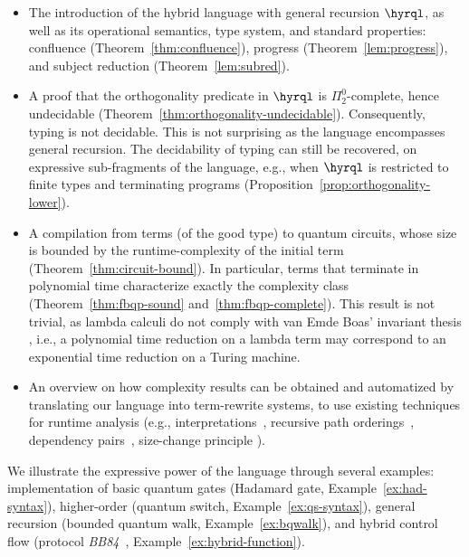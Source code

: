 \begin{itemize}
  \item The introduction of the hybrid language with general recursion $\hyrql$,
    as well as its operational semantics, type system, and
    standard properties: confluence (Theorem~\ref{thm:confluence}), progress
    (Theorem~\ref{lem:progress}), and subject reduction
    (Theorem~\ref{lem:subred}).
  \item A proof that the orthogonality predicate in $\hyrql$ is
    $\Pi^0_2$-complete, hence undecidable
    (Theorem~\ref{thm:orthogonality-undecidable}). Consequently, typing is not
    decidable. This is not surprising as the language encompasses general
    recursion. The decidability of typing can still be recovered, on expressive
    sub-fragments of the language, e.g., when $\hyrql$ is restricted to finite
    types and terminating programs (Proposition~\ref{prop:orthogonality-lower}).
  \item A compilation from terms (of the good type) to quantum circuits, whose
    size is bounded by the runtime-complexity of the initial term
    (Theorem~\ref{thm:circuit-bound}). In particular, terms that terminate in
    polynomial time characterize exactly the complexity class \fbqp{}
    (Theorem~\ref{thm:fbqp-sound} and~\ref{thm:fbqp-complete}). This result is
    not trivial, as lambda calculi do not comply with van Emde Boas' invariant
    thesis \cite{VEB90}, i.e., a polynomial time reduction on a lambda term
    may correspond to an exponential time reduction on a Turing machine.

  \item An overview on how complexity results can be obtained and
    automatized by translating our language into term-rewrite systems, to use
    existing techniques for runtime analysis (e.g.,
    interpretations~\cite{MP09}, recursive path orderings~\cite{Der82,Der87},
    dependency pairs~\cite{AG00}, size-change principle \cite{LJBA01}).
\end{itemize}

We illustrate the expressive power of the language through several examples:
implementa\-tion of basic quantum gates (Hadamard gate,
Example~\ref{ex:had-syntax}), higher-order (quantum switch,
Example~\ref{ex:qs-syntax}), general recursion (bounded quantum walk,
Example~\ref{ex:bqwalk}), and hybrid control flow (protocol
\emph{BB84}~\cite{BB84}, Example~\ref{ex:hybrid-function}).


\newcommand{\dlpz}{{\texttt{DLPZ}}}
\newcommand{\foq}{{\texttt{FOQ}}}
\newcommand{\qugcl}{{\texttt{QuGCL}}}
\newcommand{\qunity}{{\texttt{Qunity}}}
\newcommand{\rqc}{{\texttt{RQC}}}

